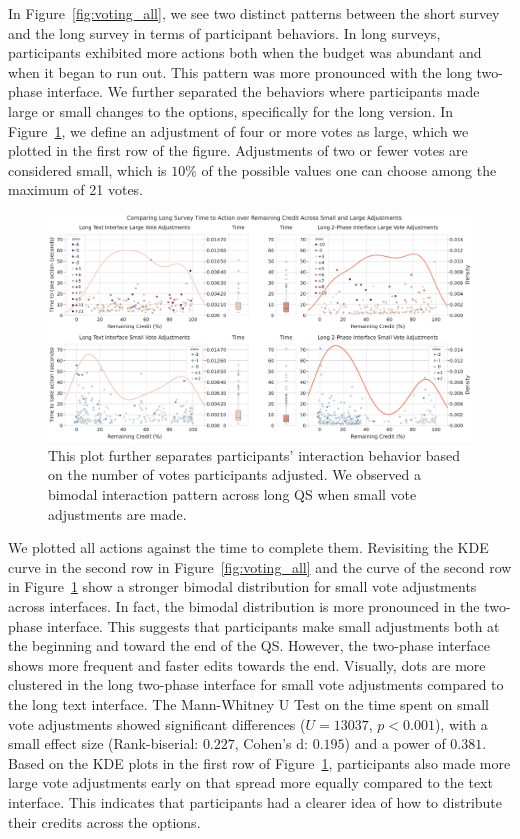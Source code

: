 In Figure~\ref{fig:voting_all}, we see two distinct patterns between the short survey and the long survey in terms of participant behaviors. In long surveys, participants exhibited more actions both when the budget was abundant and when it began to run out. This pattern was more pronounced with the long two-phase interface. We further separated the behaviors where participants made large or small changes to the options, specifically for the long version. In Figure~\ref{fig:voting_v3_v4}, we define an adjustment of four or more votes as large, which we plotted in the first row of the figure. Adjustments of two or fewer votes are considered small, which is $10\%$ of the possible values one can choose among the maximum of 21 votes.

\begin{figure}[ht]
    \centering
    \includegraphics[width=\textwidth]{content/image/results/combined_density_plots.pdf}
    \caption{This plot further separates participants' interaction behavior based on the number of votes participants adjusted. We observed a bimodal interaction pattern across long QS when small vote adjustments are made.}
    \label{fig:voting_v3_v4}
\end{figure}

We plotted all actions against the time to complete them. Revisiting the KDE curve in the second row in Figure~\ref{fig:voting_all} and the curve of the second row in Figure~\ref{fig:voting_v3_v4} show a stronger bimodal distribution for small vote adjustments across interfaces. In fact, the bimodal distribution is more pronounced in the two-phase interface. This suggests that participants make small adjustments both at the beginning and toward the end of the QS. However, the two-phase interface shows more frequent and faster edits towards the end. Visually, dots are more clustered in the long two-phase interface for small vote adjustments compared to the long text interface. The Mann-Whitney U Test on the time spent on small vote adjustments showed significant differences ($U=13037$, $p<0.001$), with a small effect size (Rank-biserial: $0.227$, Cohen's d: $0.195$) and a power of $0.381$. Based on the KDE plots in the first row of Figure~\ref{fig:voting_v3_v4}, participants also made more large vote adjustments early on that spread more equally compared to the text interface. This indicates that participants had a clearer idea of how to distribute their credits across the options.

